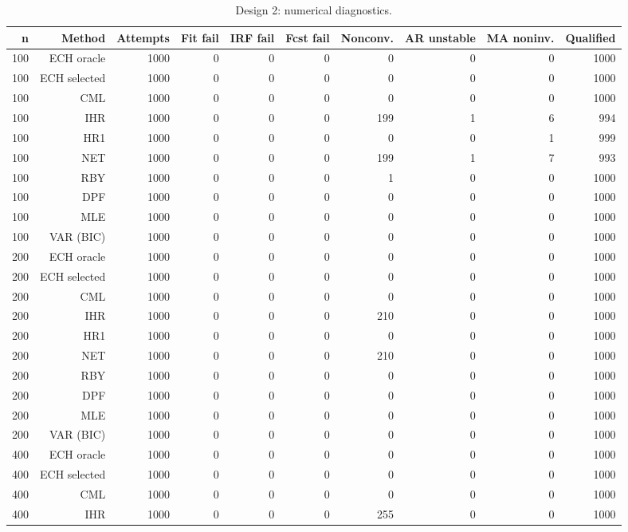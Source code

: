 \begin{table}[p]\centering
\caption{Design 2: numerical diagnostics.}
\small
\begin{tabular}{rrrrrrrrrr}\toprule
n & Method & Attempts & Fit fail & IRF fail & Fcst fail & Nonconv. & AR unstable & MA noninv. & Qualified \\\midrule
100 & ECH oracle & 1000 & 0 & 0 & 0 &   0 & 0 & 0 & 1000 \\
100 & ECH selected & 1000 & 0 & 0 & 0 &   0 & 0 & 0 & 1000 \\
100 & CML & 1000 & 0 & 0 & 0 &   0 & 0 & 0 & 1000 \\
100 & IHR & 1000 & 0 & 0 & 0 & 199 & 1 & 6 &  994 \\
100 & HR1 & 1000 & 0 & 0 & 0 &   0 & 0 & 1 &  999 \\
100 & NET & 1000 & 0 & 0 & 0 & 199 & 1 & 7 &  993 \\
100 & RBY & 1000 & 0 & 0 & 0 &   1 & 0 & 0 & 1000 \\
100 & DPF & 1000 & 0 & 0 & 0 &   0 & 0 & 0 & 1000 \\
100 & MLE & 1000 & 0 & 0 & 0 &   0 & 0 & 0 & 1000 \\
100 & VAR (BIC) & 1000 & 0 & 0 & 0 &   0 & 0 & 0 & 1000 \\
200 & ECH oracle & 1000 & 0 & 0 & 0 &   0 & 0 & 0 & 1000 \\
200 & ECH selected & 1000 & 0 & 0 & 0 &   0 & 0 & 0 & 1000 \\
200 & CML & 1000 & 0 & 0 & 0 &   0 & 0 & 0 & 1000 \\
200 & IHR & 1000 & 0 & 0 & 0 & 210 & 0 & 0 & 1000 \\
200 & HR1 & 1000 & 0 & 0 & 0 &   0 & 0 & 0 & 1000 \\
200 & NET & 1000 & 0 & 0 & 0 & 210 & 0 & 0 & 1000 \\
200 & RBY & 1000 & 0 & 0 & 0 &   0 & 0 & 0 & 1000 \\
200 & DPF & 1000 & 0 & 0 & 0 &   0 & 0 & 0 & 1000 \\
200 & MLE & 1000 & 0 & 0 & 0 &   0 & 0 & 0 & 1000 \\
200 & VAR (BIC) & 1000 & 0 & 0 & 0 &   0 & 0 & 0 & 1000 \\
400 & ECH oracle & 1000 & 0 & 0 & 0 &   0 & 0 & 0 & 1000 \\
400 & ECH selected & 1000 & 0 & 0 & 0 &   0 & 0 & 0 & 1000 \\
400 & CML & 1000 & 0 & 0 & 0 &   0 & 0 & 0 & 1000 \\
400 & IHR & 1000 & 0 & 0 & 0 & 255 & 0 & 0 & 1000 \\

\end{tabular}
\end{table}
